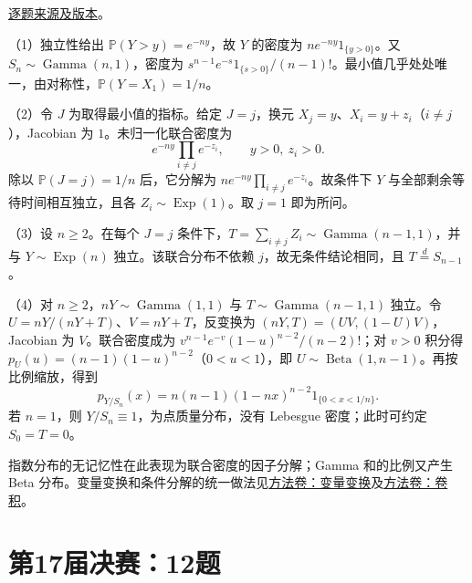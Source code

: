 \documentclass[UTF8,12pt,a4paper,fontset=fandol]{ctexbook}
\begin{document}
\href{https://github.com/lzxcr/cmc-mathematics/blob/64916fa1fdbc3e444a652eca204d5669058ee321/src/problems/finals/16/15.md}{逐题来源及版本}。

\begin{solve}

（1）独立性给出 $\mathbb P(Y>y)=e^{-ny}$，故 $Y$ 的密度为 $ne^{-ny}1_{\{y>0\}}$。又 $S_n\sim\operatorname{Gamma}(n,1)$，密度为 $s^{n-1}e^{-s}1_{\{s>0\}}/(n-1)!$。最小值几乎处处唯一，由对称性，$\mathbb P(Y=X_1)=1/n$。

（2）令 $J$ 为取得最小值的指标。给定 $J=j$，换元 $X_j=y$、$X_i=y+z_i$（$i\ne j$），Jacobian 为 $1$。未归一化联合密度为
\[
e^{-ny}\prod_{i\ne j}e^{-z_i},\qquad y>0,\ z_i>0.
\]
除以 $\mathbb P(J=j)=1/n$ 后，它分解为 $ne^{-ny}\prod_{i\ne j}e^{-z_i}$。故条件下 $Y$ 与全部剩余等待时间相互独立，且各 $Z_i\sim\operatorname{Exp}(1)$。取 $j=1$ 即为所问。

（3）设 $n\ge2$。在每个 $J=j$ 条件下，$T=\sum_{i\ne j}Z_i\sim\operatorname{Gamma}(n-1,1)$，并与 $Y\sim\operatorname{Exp}(n)$ 独立。该联合分布不依赖 $j$，故无条件结论相同，且 $T\overset d=S_{n-1}$。

（4）对 $n\ge2$，$nY\sim\operatorname{Gamma}(1,1)$ 与 $T\sim\operatorname{Gamma}(n-1,1)$ 独立。令 $U=nY/(nY+T)$、$V=nY+T$，反变换为 $(nY,T)=(UV,(1-U)V)$，Jacobian 为 $V$。联合密度成为 $v^{n-1}e^{-v}(1-u)^{n-2}/(n-2)!$；对 $v>0$ 积分得 $p_U(u)=(n-1)(1-u)^{n-2}$（$0<u<1$），即 $U\sim\operatorname{Beta}(1,n-1)$。再按比例缩放，得到
\[
\boxed{p_{Y/S_n}(x)=n(n-1)(1-nx)^{n-2}1_{\{0<x<1/n\}}}.
\]
若 $n=1$，则 $Y/S_n\equiv1$，为点质量分布，没有 Lebesgue 密度；此时可约定 $S_0=T=0$。

\end{solve}

\begin{remark}[方法与条件]

指数分布的无记忆性在此表现为联合密度的因子分解；Gamma 和的比例又产生 Beta 分布。变量变换和条件分解的统一做法见\hyperref[app:probability-transforms]{方法卷：变量变换}及\hyperref[app:probability-convolution]{方法卷：卷积}。

\end{remark}

\section{第17届决赛：12题}\label{pr:fin17-high:12}
\end{document}
